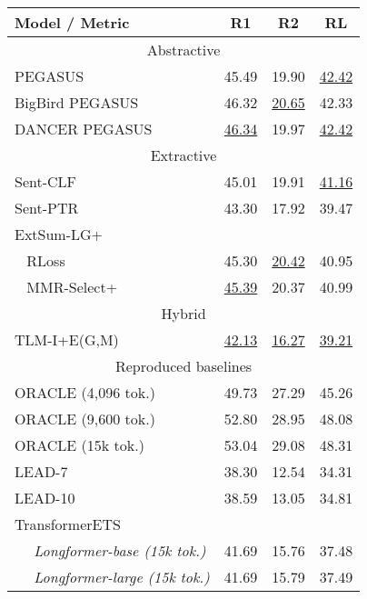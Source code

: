 \documentclass[11pt]{article}
\begin{document}
\begin{table}[ht]
\fontsize{9}{9}
\selectfont
\centering
\begin{tabular}[t]{@{}llll@{}}
\toprule
Model  / Metric   & \multicolumn{1}{c}{R1} & \multicolumn{1}{c}{R2} & \multicolumn{1}{c}{RL} \\ \midrule
\multicolumn{4}{c}{Abstractive}               \\ \midrule
PEGASUS \citeyearpar{zhang2019pegasus}   & 45.49 & 19.90  & \underline{42.42} \\
BigBird PEGASUS \citeyearpar{bigbird}   & 46.32 & \underline{20.65} & 42.33 \\
DANCER PEGASUS \citeyearpar{dancer2020}   & \underline{46.34} & 19.97 & \underline{42.42} \\ \midrule
\multicolumn{4}{c}{Extractive}                \\ \midrule
Sent-CLF \citeyearpar{pilault-etal-2020-extractive}              & 45.01 & 19.91 & \underline{41.16} \\
Sent-PTR \citeyearpar{pilault-etal-2020-extractive}              & 43.30  & 17.92 & 39.47 \\
ExtSum-LG+ \citeyearpar{xiao-carenini-2020-systematically}   & & &\\
~ RLoss      & 45.30  & \underline{20.42} & 40.95 \\
~ MMR-Select+ & \underline{45.39} & 20.37 & 40.99 \\ \midrule
\multicolumn{4}{c}{Hybrid}                    \\ \midrule
TLM-I+E(G,M) \citeyearpar{pilault-etal-2020-extractive}       & \underline{42.13} & \underline{16.27} & \underline{39.21} \\ \midrule \multicolumn{4}{c}{Reproduced baselines}                           \\ \midrule
ORACLE (4,096 tok.)     & 49.73   & 27.29 & 45.26  \\
ORACLE (9,600 tok.)      & 52.80    & 28.95 & 48.08  \\
ORACLE (15k tok.)      & 53.04   & 29.08 & 48.31  \\
LEAD-7                       & 38.30    & 12.54 & 34.31  \\
LEAD-10                      & 38.59   & 13.05 & 34.81  \\
TransformerETS   & & & \\
~~ \textit{Longformer-base (15k tok.)}   & 41.69   & 15.76 & 37.48  \\
~~ \textit{Longformer-large (15k tok.)}  & 41.69   & 15.79 & 37.49  \\ \midrule

\end{tabular}
\end{table}
\end{document}
